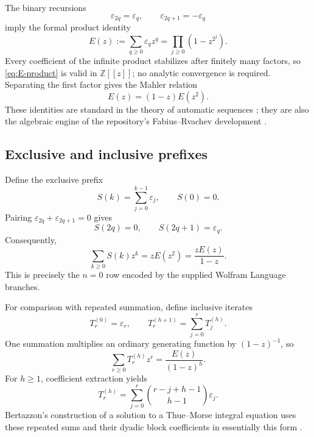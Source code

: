 \documentclass[11pt,oneside]{article}
\numberwithin{equation}{section}
\theoremstyle{definition}
\theoremstyle{remark}
\newcommand{\Z}{\mathbb Z}
\newcommand{\eps}{\varepsilon}
\newcommand{\Prefix}{T}
\begin{document}
The binary recursions
\begin{equation}
  \eps_{2q}=\eps_q,
  \qquad
  \eps_{2q+1}=-\eps_q
  \label{eq:tm-recursion}
\end{equation}
imply the formal product identity
\begin{equation}
 E(z):=\sum_{q\ge0}\eps_qz^q
 =\prod_{j\ge0}(1-z^{2^j}).
 \label{eq:E-product}
\end{equation}
Every coefficient of the infinite product stabilizes after finitely many
factors, so \eqref{eq:E-product} is valid in \(\Z[[z]]\); no analytic
convergence is required.  Separating the first factor gives the Mahler
relation
\begin{equation}
 E(z)=(1-z)E(z^2).
 \label{eq:Mahler}
\end{equation}
These identities are standard in the theory of automatic sequences
\cite{AlloucheShallit}; they are also the algebraic engine of the repository's
Fabius--Rvachev development \cite{ReshetnikovAtlas}.

\subsection{Exclusive and inclusive prefixes}

Define the exclusive prefix
\begin{equation}
 S(k)=\sum_{j=0}^{k-1}\eps_j,
 \qquad S(0)=0.
 \label{eq:exclusive-prefix}
\end{equation}
Pairing \(\eps_{2q}+\eps_{2q+1}=0\) gives
\begin{equation}
 S(2q)=0,
 \qquad
 S(2q+1)=\eps_q.
 \label{eq:prefix-collapse}
\end{equation}
Consequently,
\begin{equation}
 \sum_{k\ge0}S(k)z^k
 =zE(z^2)
 =\frac{zE(z)}{1-z}.
 \label{eq:prefix-gf}
\end{equation}
This is precisely the \(n=0\) row encoded by the supplied Wolfram Language
branches.

For comparison with repeated summation, define inclusive iterates
\begin{equation}
 \Prefix_r^{(0)}=\eps_r,
 \qquad
 \Prefix_r^{(h+1)}=\sum_{j=0}^{r}\Prefix_j^{(h)}.
 \label{eq:inclusive-prefix-definition}
\end{equation}
One summation multiplies an ordinary generating function by \((1-z)^{-1}\),
so
\begin{equation}
 \sum_{r\ge0}\Prefix_r^{(h)}z^r
 =\frac{E(z)}{(1-z)^h}.
 \label{eq:inclusive-prefix-gf}
\end{equation}
For \(h\ge1\), coefficient extraction yields
\begin{equation}
 \Prefix_r^{(h)}
 =\sum_{j=0}^{r}
 \binom{r-j+h-1}{h-1}\eps_j.
 \label{eq:inclusive-prefix-convolution}
\end{equation}
Bertazzon's construction of a solution to a Thue--Morse integral equation uses
these repeated sums and their dyadic block coefficients in essentially this
form \cite{Bertazzon2012}.
\end{document}
